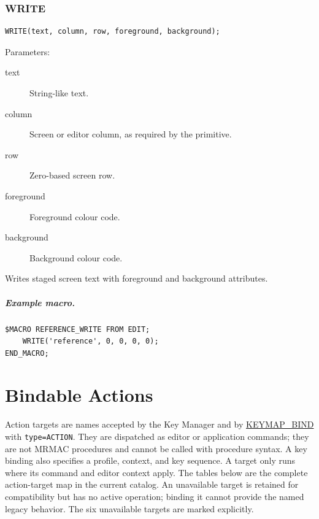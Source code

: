 \documentclass[a4paper,10pt,twoside,openany]{book}
\newenvironment{mrmacextension}{\begin{changebar}}{\end{changebar}}
\begin{document}
\label{prim:procedure-write}
\subsection*{WRITE}
\begin{verbatim}
WRITE(text, column, row, foreground, background);
\end{verbatim}
Parameters:
\begin{description}
\item[text] String-like text.
\item[column] Screen or editor column, as required by the primitive.
\item[row] Zero-based screen row.
\item[foreground] Foreground colour code.
\item[background] Background colour code.
\end{description}

Writes staged screen text with foreground and background attributes.

\paragraph{Example macro.}
\begin{verbatim}
$MACRO REFERENCE_WRITE FROM EDIT;
    WRITE('reference', 0, 0, 0, 0);
END_MACRO;
\end{verbatim}



\chapter{Bindable Actions}

\begin{mrmacextension}
Action targets are names accepted by the Key Manager and by
\hyperref[prim:procedure-keymap-bind]{KEYMAP\_BIND} with
\texttt{type=ACTION}. They are dispatched as editor or application commands;
they are not MRMAC procedures and cannot be called with procedure syntax.
A key binding also specifies a profile, context, and key sequence. A target
only runs where its command and editor context apply. The tables below are
the complete action-target map in the current catalog. An unavailable target
is retained for compatibility but has no active operation; binding it cannot
provide the named legacy behavior. The six unavailable targets are marked
explicitly.
\end{mrmacextension}
\end{document}
